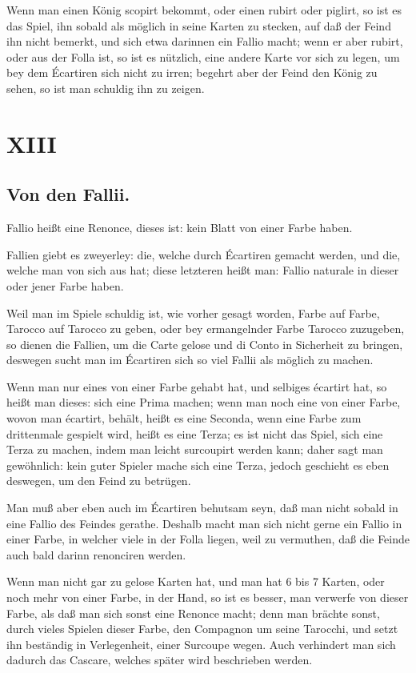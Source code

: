 \documentclass[11pt,a6paper,twoside]{article}
\begin{document}
Wenn man einen König scopirt bekommt, oder einen rubirt oder piglirt, so ist es das Spiel, ihn sobald als möglich in seine Karten zu stecken, auf daß der Feind ihn nicht bemerkt, und sich etwa darinnen ein Fallio macht; wenn er aber rubirt, oder aus der Folla ist, so ist es nützlich, eine andere Karte vor sich zu legen, um bey dem Écartiren sich nicht zu irren; begehrt aber der Feind den König zu sehen, so ist man schuldig ihn zu zeigen.

\section{XIII}
\subsection{Von den Fallii.}

Fallio heißt eine Renonce, dieses ist: kein Blatt von einer Farbe haben.

Fallien giebt es zweyerley: die, welche durch Écartiren gemacht werden, und die, welche man von sich aus hat; diese letzteren heißt man: Fallio naturale in dieser oder jener Farbe haben.

Weil man im Spiele schuldig ist, wie vorher gesagt worden, Farbe auf Farbe, Tarocco auf Tarocco zu geben, oder bey ermangelnder Farbe Tarocco zuzugeben, so dienen die Fallien, um die Carte gelose und di Conto in Sicherheit zu bringen, deswegen sucht man im Écartiren sich so viel Fallii als möglich zu machen.

Wenn man nur eines von einer Farbe gehabt hat, und selbiges écartirt hat, so heißt man dieses: sich eine Prima machen; wenn man noch eine von einer Farbe, wovon man écartirt, behält, heißt es eine Seconda, wenn eine Farbe zum drittenmale gespielt wird, heißt es eine Terza; es ist nicht das Spiel, sich eine Terza zu machen, indem man leicht surcoupirt werden kann; daher sagt man gewöhnlich: kein guter Spieler mache sich eine Terza, jedoch geschieht es eben deswegen, um den Feind zu betrügen.

Man muß aber eben auch im Écartiren behutsam seyn, daß man nicht sobald in eine Fallio des Feindes gerathe. Deshalb macht man sich nicht gerne ein Fallio in einer Farbe, in welcher viele in der Folla liegen, weil zu vermuthen, daß die Feinde auch bald darinn renonciren werden.

Wenn man nicht gar zu gelose Karten hat, und man hat 6 bis 7 Karten, oder noch mehr von einer Farbe, in der Hand, so ist es besser, man verwerfe von dieser Farbe, als daß man sich sonst eine Renonce macht; denn man brächte sonst, durch vieles Spielen dieser Farbe, den Compagnon um seine Tarocchi, und setzt ihn beständig in Verlegenheit, einer Surcoupe wegen. Auch verhindert man sich dadurch das Cascare, welches später wird beschrieben werden.
\end{document}
